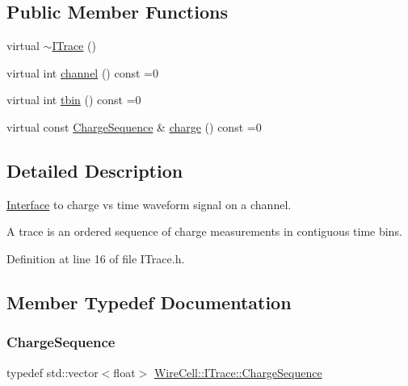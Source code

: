 \subsection*{Public Member Functions}
\begin{DoxyCompactItemize}
\item 
virtual \hyperlink{class_wire_cell_1_1_i_trace_a7ce72d715939df69a8daa5138d25e69f}{$\sim$\+I\+Trace} ()
\item 
virtual int \hyperlink{class_wire_cell_1_1_i_trace_ae5903cdd197baf3b0ea67d80685851cb}{channel} () const =0
\item 
virtual int \hyperlink{class_wire_cell_1_1_i_trace_ab8ffd89fdf73ef4b7b55af2f9c4312df}{tbin} () const =0
\item 
virtual const \hyperlink{class_wire_cell_1_1_i_trace_a3dab103257bc46bfd486966f69836954}{Charge\+Sequence} \& \hyperlink{class_wire_cell_1_1_i_trace_a55a746bfec82aa0214f0462ae28476e0}{charge} () const =0
\end{DoxyCompactItemize}


\subsection{Detailed Description}
\hyperlink{class_wire_cell_1_1_interface}{Interface} to charge vs time waveform signal on a channel.

A trace is an ordered sequence of charge measurements in contiguous time bins. 

Definition at line 16 of file I\+Trace.\+h.



\subsection{Member Typedef Documentation}
\mbox{\label{class_wire_cell_1_1_i_trace_a3dab103257bc46bfd486966f69836954}} 
\subsubsection{\texorpdfstring{Charge\+Sequence}{ChargeSequence}}
{\footnotesize\ttfamily typedef std\+::vector$<$float$>$ \hyperlink{class_wire_cell_1_1_i_trace_a3dab103257bc46bfd486966f69836954}{Wire\+Cell\+::\+I\+Trace\+::\+Charge\+Sequence}}



